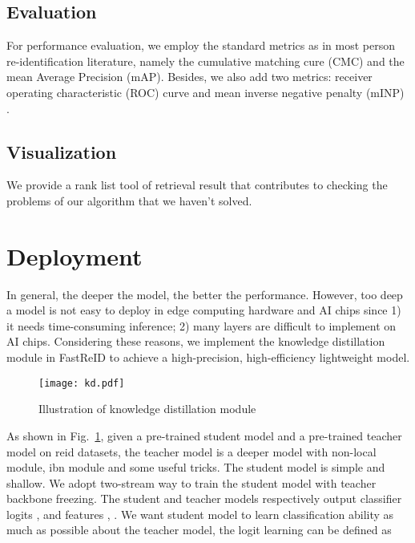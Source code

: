 \documentclass[10pt,twocolumn,letterpaper]{article}
\begin{document}
\subsection{Evaluation}
For performance evaluation, we employ the standard metrics as in most person re-identification literature, namely the cumulative matching cure (CMC) and the mean Average Precision (mAP). Besides, we also add two metrics: receiver operating characteristic (ROC) curve and mean inverse negative penalty (mINP) \cite{ye2020deep}.

\subsection{Visualization}
We provide a rank list tool of retrieval result that contributes to checking the problems of our algorithm that we haven't solved.

\section{Deployment}
In general, the deeper the model, the better the performance. However, too deep a model is not easy to deploy in edge computing hardware and AI chips since 1) it needs time-consuming inference; 2) many layers are difficult to implement on AI chips. Considering these reasons, we implement the knowledge distillation module in FastReID to achieve a high-precision, high-efficiency lightweight model. 

\begin{figure}[t]
    \centering
       \vspace{0em}
    \texttt{[image: kd.pdf]}
     \caption{Illustration of knowledge distillation module}
    \label{fig6}
\end{figure}
As shown in Fig.~\ref{fig6}, given a pre-trained student model and a pre-trained teacher model on reid datasets, the teacher model is a deeper model with non-local module, ibn module and some useful tricks. The student model is simple and shallow. We adopt two-stream way to train the student model with teacher backbone freezing. The student and teacher models respectively output classifier logits ,  and features , . We want student model to learn classification ability as much as possible about the teacher model, the logit learning can be defined as
\end{document}
